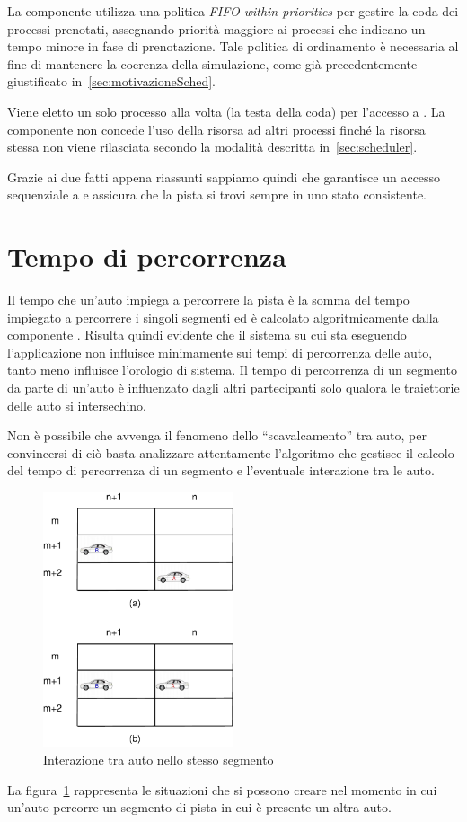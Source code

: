 La componente \sched{} utilizza una politica \textit{FIFO within priorities} per gestire la coda dei processi prenotati, assegnando priorità maggiore ai processi che indicano un tempo minore in fase di prenotazione.
Tale politica di ordinamento è necessaria al fine di mantenere la coerenza della simulazione, come già precedentemente giustificato in~\ref{sec:motivazioneSched}.

Viene eletto un solo processo alla volta (la testa della coda) per l'accesso a \track{}. La componente \sched{} non concede l'uso della risorsa ad altri processi finché la risorsa stessa non viene rilasciata secondo la modalità descritta in~\ref{sec:scheduler}.

Grazie ai due fatti appena riassunti sappiamo quindi che \sched{} garantisce un accesso sequenziale a \track{} e assicura che la pista si trovi sempre in uno stato consistente.

\section{Tempo di percorrenza}
Il tempo che un'auto impiega a percorrere la pista è la somma del tempo impiegato a percorrere i singoli segmenti ed è calcolato algoritmicamente dalla componente \track{}. Risulta quindi evidente che il sistema su cui sta eseguendo l'applicazione non influisce minimamente sui tempi di percorrenza delle auto, tanto meno influisce l'orologio di sistema. Il tempo di percorrenza di un segmento da parte di un'auto è influenzato dagli altri partecipanti solo qualora le traiettorie delle auto si intersechino.

Non è possibile che avvenga il fenomeno dello ``scavalcamento'' tra auto, per convincersi di ciò basta analizzare attentamente l'algoritmo che gestisce il calcolo del tempo di percorrenza di un segmento e l'eventuale interazione tra le auto.

\begin{figure}
\begin{center}
\includegraphics[width=0.5\textwidth]{diagrammi/Surpass}
\caption{Interazione tra auto nello stesso segmento}
\label{fig:surpass}
\end{center}
\end{figure}
La figura~\ref{fig:surpass} rappresenta le situazioni che si possono creare nel momento in cui un'auto percorre un segmento di pista in cui è presente un altra auto.

